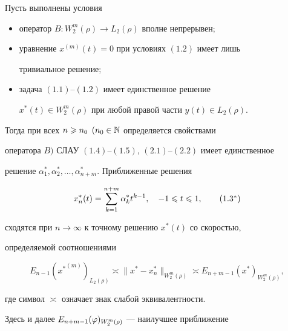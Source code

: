 \begin{thm}


Пусть выполнены условия


\begin{itemize}


\item[а)] оператор $B:W_2^m(\rho)\to L_2(\rho)$ вполне непрерывен$;$


\item[б)] уравнение $x^{(m)}(t)=0$ при условиях $(1.2)$ имеет лишь 


тривиальное решение$;$


\item[в)] задача $(1.1)$--$(1.2)$ имеет единственное решение


$x^*(t)\in W_2^m(\rho)$ при любой правой части $y(t)\in L_2(\rho)$.


\end{itemize}





Тогда при всех $n\geqslant n_0$ $(n_0\in \Bbb{N}$ определяется свойствами


оператора $B)$ СЛАУ $(1.4)$--$(1.5)$, $(2.1)$--$(2.2)$ имеет единственное 


решение $\alpha_1^*,\alpha_2^*,\dotsc, \alpha_{n+m}^*$. Приближенные решения


\begin{equation}


x_n^*(t)=\suml_{k=1}^{n+m}\alpha_k^*t^{k-1},\quad -1\lea t\lea 1,


\tag{1.3${}^*$}


\end{equation}


сходятся при $n\to \infty$ к точному решению $x^*(t)$ со скоростью, 


определяемой соотношениями


\begin{equation}


E_{n-1}({x^*}^{(m)})_{L_2(\rho)}\asymp \|x^*-x^*_n\|_{W_2^m(\rho)} \asymp


E_{n+m-1}(x^*)_{W_2^m(\rho)},


\end{equation}


где символ $\asymp$ означает знак слабой эквивалентности.


\end{thm}





Здесь и далее $E_{n+m-1}(\varphi)_{W_2^m(\rho)}$ --- наилучшее приближение 


